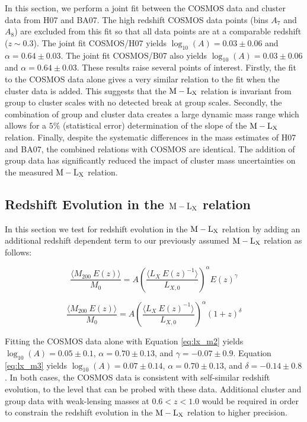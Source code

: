 \documentclass[12pt]{emulateapj}
\newcommand{\mlx}{$\rm{M} - \rm{L}_{\rm X}$ }
\newcommand{\henkalpha}{$\alpha=0.64 \pm 0.03$}
\begin{document}
In this section, we perform a joint fit between the COSMOS data and
cluster data from H07 and BA07. The high redshift COSMOS data points
(bins $A_7$ and $A_8$) are excluded from this fit so that all data
points are at a comparable redshift ($z\sim 0.3$). The joint fit
COSMOS/H07 yields $\log_{10}(A)=0.03 \pm 0.06$ and \henkalpha. The
joint fit COSMOS/B07 also yields $\log_{10}(A)=0.03 \pm 0.06$ and
$\alpha=0.64 \pm 0.03$. These results raise several points of
interest. Firstly, the fit to the COSMOS data alone gives a very
similar relation to the fit when the cluster data is added. This
suggests that the \mlx relation is invariant from group to cluster
scales with no detected break at group scales. Secondly, the
combination of group and cluster data creates a large dynamic mass
range which allows for a $5\%$ (statistical error) determination of
the slope of the \mlx relation. Finally, despite the systematic
differences in the mass estimates of H07 and BA07, the combined
relations with COSMOS are identical. The addition of group data has
significantly reduced the impact of cluster mass uncertainties on the
measured \mlx relation.

\subsection{Redshift Evolution in the \mlx relation}\label{evolution}

In this section we test for redshift evolution in the \mlx relation by
adding an additional redshift dependent term to our previously assumed
\mlx relation as follows:

\begin{equation}
  \frac{\langle M_{200}~E(z)\rangle }{M_0} = A \left( \frac{\langle L_{X}~E(z)^{-1}\rangle }{L_{X,0}} \right)^{\alpha}E(z)^{\gamma}
\label{eq:lx_m2}
\end{equation}

\begin{equation}
  \frac{\langle M_{200}~E(z)\rangle }{M_0} = A \left( \frac{\langle L_{X}~E(z)^{-1}\rangle }{L_{X,0}} \right)^{\alpha}(1+z)^{\delta}
\label{eq:lx_m3}
\end{equation}

Fitting the COSMOS data alone with Equation \ref{eq:lx_m2} yields
$\log_{10}(A)=0.05 \pm 0.1$, $\alpha=0.70 \pm 0.13$, and $\gamma=-0.07
\pm 0.9$. Equation \ref{eq:lx_m3} yields $\log_{10}(A)=0.07 \pm 0.14$,
$\alpha=0.70 \pm 0.13$, and $\delta=-0.14 \pm 0.8$. In both cases, the
COSMOS data is consistent with self-similar redshift evolution, to the
level that can be probed with these data. Additional cluster and group
data with weak-lensing masses at $0.6<z<1.0$ would be required in
order to constrain the redshift evolution in the \mlx relation to
higher precision.
\end{document}

